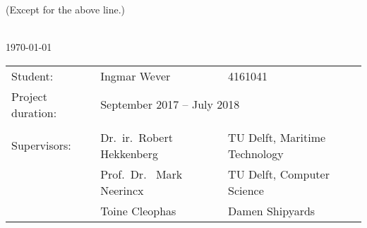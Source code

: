 {\begin{center}
		\tiny{(Except for the above line.)}

	\end{center}

	\begin{titlepage}
		\newpage
		\setcounter{page}{0}
		
		\centering
		\Large
		\vspace*{3cm}
		\doctitle\\
		\large
		\vspace{1cm}
		\today
		
		\vspace{7cm}
		\normalsize
		\begin{tabular}{lll}
			Student: & Ingmar Wever & 4161041 \\
			Project duration: & \multicolumn{2}{l}{September 2017 -- July 2018} \\
			& & \\
			Supervisors: & Dr.\ ir.\ Robert Hekkenberg & TU Delft, Maritime Technology \\
			& Prof.\ Dr. \ Mark Neerincx & TU Delft, Computer Science \\
			& Toine Cleophas & Damen Shipyards
		\end{tabular}

\end{titlepage}
		
}
	